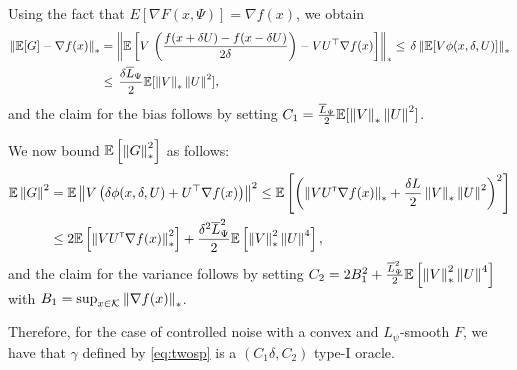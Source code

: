 Using the fact that $E[\nabla F(x,\Psi)] = \nabla f(x)$, we obtain
\begin{align*}
 \left\|\mathbb{E}[G] - \nabla f(x)\right\|_*
 &= \left\|\mathbb{E}\left[V\,  \left(\frac{f(x+\delta U)  -f(x-\delta U)}{2\delta}\right)-V U^\top\nabla f(x) \right]\right\|_*
 \le \, \delta \left\|\mathbb{E}[ V \phi(x,\delta, U)]\right\|_*\\
 &\le \,\frac{\delta \overline{L}_{\Psi}}{2} \mathbb{E}[ \left\|V\right\|_* \left\|U\right\|^2],
\end{align*}
and the claim for the bias follows by setting $C_1= \frac{\overline{L}_{\Psi}}{2} \mathbb{E}[ \left\|V\right\|_* \left\|U\right\|^2]$.

We now bound $\mathbb{E}\left[ \left\|G\right\|_*^2\right]$ as follows:
\begin{align*}
 \mathbb{E} \left\|G\right\|^2
& = \mathbb{E}\left\|V\left(\delta \phi(x,\delta, U)+ U^\top\nabla f(x) \right)\right\|^2
 \le  \mathbb{E}\left[ \left( \left\| V U ^\mathsf{\scriptscriptstyle T} \nabla f(x)\right\|_* + \frac{\delta L}{2} \left\|V\right\|_* \left\|U\right\|^2 \right)^2\right]\\
& \le  2 \mathbb{E}\left[  \left\| V U ^\mathsf{\scriptscriptstyle T} \nabla f(x)\right\|_*^2\right]  + \frac{\delta^2 \overline{L}_{\Psi}^2}{2}\mathbb{E}\left[ \left\|V\right\|_*^2 \left\|U\right\|^4 \right],
\end{align*}
and the claim for the variance follows by setting $C_2 =  2 B_1^2  + \frac{ \overline{L}_{\Psi}^2}{2}\mathbb{E}\left[ \left\|V\right\|_*^2 \left\|U\right\|^4 \right]$ with $B_1 = \sup_{x\in \mathcal{K}} \left\|\nabla f(x)\right\|_*$.

Therefore, for the case of controlled noise with a convex and $L_{\psi}$-smooth $F$, we have that $\gamma$ defined by \eqref{eq:twosp} is a $(C_1\delta, C_2)$ type-I oracle.  



